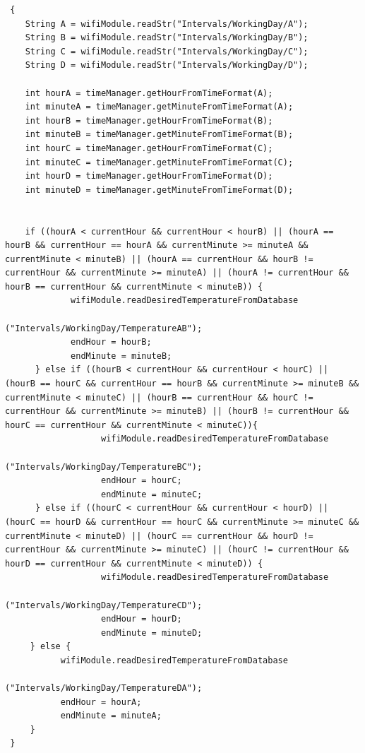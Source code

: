 \begin{lstlisting}
 {
    String A = wifiModule.readStr("Intervals/WorkingDay/A");
    String B = wifiModule.readStr("Intervals/WorkingDay/B");
    String C = wifiModule.readStr("Intervals/WorkingDay/C");
    String D = wifiModule.readStr("Intervals/WorkingDay/D");

    int hourA = timeManager.getHourFromTimeFormat(A);
    int minuteA = timeManager.getMinuteFromTimeFormat(A);
    int hourB = timeManager.getHourFromTimeFormat(B);
    int minuteB = timeManager.getMinuteFromTimeFormat(B);
    int hourC = timeManager.getHourFromTimeFormat(C);
    int minuteC = timeManager.getMinuteFromTimeFormat(C);
    int hourD = timeManager.getHourFromTimeFormat(D);
    int minuteD = timeManager.getMinuteFromTimeFormat(D);


    if ((hourA < currentHour && currentHour < hourB) || (hourA == hourB && currentHour == hourA && currentMinute >= minuteA && currentMinute < minuteB) || (hourA == currentHour && hourB != currentHour && currentMinute >= minuteA) || (hourA != currentHour && hourB == currentHour && currentMinute < minuteB)) {
             wifiModule.readDesiredTemperatureFromDatabase
									("Intervals/WorkingDay/TemperatureAB");
             endHour = hourB;
             endMinute = minuteB;
      } else if ((hourB < currentHour && currentHour < hourC) || (hourB == hourC && currentHour == hourB && currentMinute >= minuteB && currentMinute < minuteC) || (hourB == currentHour && hourC != currentHour && currentMinute >= minuteB) || (hourB != currentHour && hourC == currentHour && currentMinute < minuteC)){
                   wifiModule.readDesiredTemperatureFromDatabase
									("Intervals/WorkingDay/TemperatureBC");
                   endHour = hourC;
                   endMinute = minuteC;
      } else if ((hourC < currentHour && currentHour < hourD) ||  (hourC == hourD && currentHour == hourC && currentMinute >= minuteC && currentMinute < minuteD) || (hourC == currentHour && hourD != currentHour && currentMinute >= minuteC) || (hourC != currentHour && hourD == currentHour && currentMinute < minuteD)) {
                   wifiModule.readDesiredTemperatureFromDatabase
									("Intervals/WorkingDay/TemperatureCD");
                   endHour = hourD;
                   endMinute = minuteD;
     } else {
           wifiModule.readDesiredTemperatureFromDatabase
									("Intervals/WorkingDay/TemperatureDA");
           endHour = hourA;
           endMinute = minuteA;
     }
 }
\end{lstlisting}
\vspace{2em}

